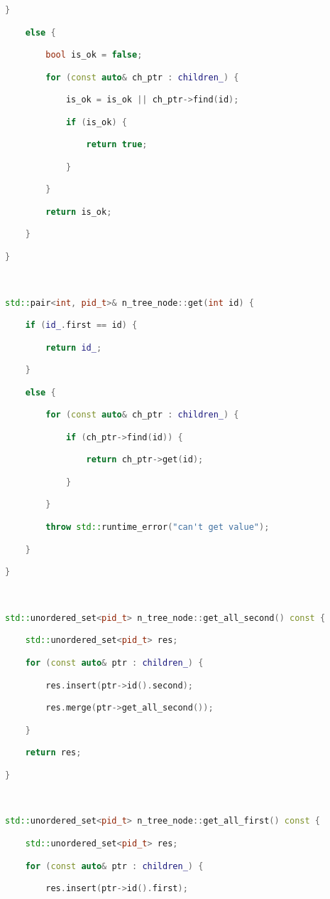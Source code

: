 \begin{lstlisting}[language=C++]
    } 

    else {

        bool is_ok = false;

        for (const auto& ch_ptr : children_) {

            is_ok = is_ok || ch_ptr->find(id);

            if (is_ok) {

                return true;

            }

        }

        return is_ok;

    }

}



std::pair<int, pid_t>& n_tree_node::get(int id) {

    if (id_.first == id) {

        return id_;

    } 

    else {

        for (const auto& ch_ptr : children_) {

            if (ch_ptr->find(id)) {

                return ch_ptr->get(id);

            }

        }

        throw std::runtime_error("can't get value");

    }

}



std::unordered_set<pid_t> n_tree_node::get_all_second() const {

    std::unordered_set<pid_t> res;

    for (const auto& ptr : children_) {

        res.insert(ptr->id().second);

        res.merge(ptr->get_all_second());

    }

    return res;

}



std::unordered_set<pid_t> n_tree_node::get_all_first() const {

    std::unordered_set<pid_t> res;

    for (const auto& ptr : children_) {

        res.insert(ptr->id().first);


\end{lstlisting}
